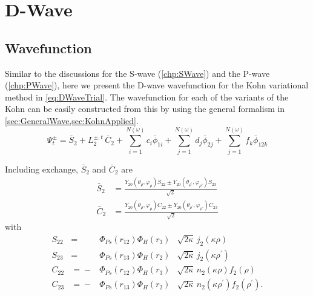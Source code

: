 \documentclass[Dissertation.tex]{subfiles}
\begin{document}
\chapter{D-Wave}
\label{chp:DWave}


\section{Wavefunction}
\label{sec:DWaveFn}

Similar to the discussions for the S-wave (\cref{chp:SWave}) and the P-wave
(\cref{chp:PWave}), here we present the D-wave wavefunction for the Kohn
variational method in \cref{eq:DWaveTrial}. The wavefunction for each of the 
variants of the Kohn can be easily constructed from this by using the general
formalism in \cref{sec:GeneralWave,sec:KohnApplied}.
\begin{equation}
\Psi_t^\pm = \bar{S}_2 + L_2^{\pm,t} \, \bar{C}_2 + \sum_{i=1}^{N(\omega)} c_i \bar{\phi}_{1i} + \sum_{j=1}^{N(\omega)} d_j \bar{\phi}_{2j} + \sum_{j=1}^{N(\omega)} f_k \bar{\phi}_{12k}
\label{eq:DWaveTrial}
\end{equation}

\noindent Including exchange, $\bar{S}_2$ and $\bar{C}_2$ are
\begin{subequations}
\label{eq:DWaveSandCBar}
\begin{align}
\bar{S}_2 &= \frac{Y_{20}(\theta_\rho,\varphi_\rho)S_{22} \pm Y_{20}(\theta_{\rho^\prime},\varphi_{\rho'})S_{23} }{\sqrt{2}} \label{eq:DWaveSBar} \\
\bar{C}_2 &= \frac{Y_{20}(\theta_\rho,\varphi_\rho)C_{22} \pm Y_{20}(\theta_{\rho^\prime},\varphi_{\rho'})C_{23} }{\sqrt{2}} \label{eq:DWaveCBar} 
\end{align}
\end{subequations}
with
\begin{subequations}
\label{eq:DWaveSandC}
\begin{alignat}{2}
S_{22} &={}&\Phi_{Ps}\left(r_{12}\right) \Phi_H\left(r_3\right) &\sqrt{2\kappa} \,j_2\!\left(\kappa\rho\right) \label{eq:DWaveS22Def} \\
S_{23} &={}&\Phi_{Ps}\left(r_{13}\right) \Phi_H\left(r_2\right) &\sqrt{2\kappa} \,j_2\!\left(\kappa\rho^\prime\right) \label{eq:DWaveS23Def} \\
C_{22} &={}-&\Phi_{Ps}\left(r_{12}\right) \Phi_H\left(r_3\right) &\sqrt{2\kappa} \,n_2\!\left(\kappa\rho\right) f_{2}(\rho) \label{eq:DWaveC22Def} \\
C_{23} &={}-&\Phi_{Ps}\left(r_{13}\right) \Phi_H\left(r_2\right) &\sqrt{2\kappa} \,n_2\!\left(\kappa\rho^\prime\right) f_{2}(\rho^\prime). \label{eq:DWaveC23Def}
\end{alignat}
\end{subequations}
\end{document}
